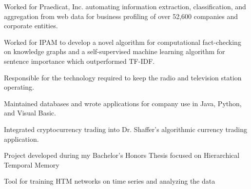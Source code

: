 \documentclass{acmresume}
\begin{document}
        \begin{titemize}
            \item{Worked for Praedicat, Inc. automating information extraction, classification, and aggregation from web data for business profiling of over 52,600 companies and corporate entities.}
            \item{Worked for IPAM to develop a novel algorithm for computational fact-checking on knowledge graphs and a self-supervised machine learning algorithm for sentence importance which outperformed TF-IDF.}
        \end{titemize}

        \begin{titemize}
            \item{Responsible for the technology required to keep the radio and television station operating.}
        \end{titemize}
		
        \begin{titemize}
            \item{Maintained databases and wrote applications for company use in Java, Python, and Visual Basic.}
        \end{titemize}

        \begin{titemize}
            \item Integrated cryptocurrency trading into Dr. Shaffer's algorithmic currency trading application.
        \end{titemize}
		
	
		
		\begin{titemize}
			\item Project developed during my Bachelor's Honors Thesis focused on Hierarchical Temporal Memory
			\item Tool for training HTM networks on time series and analyzing the data
		\end{titemize}
	
\end{document}
